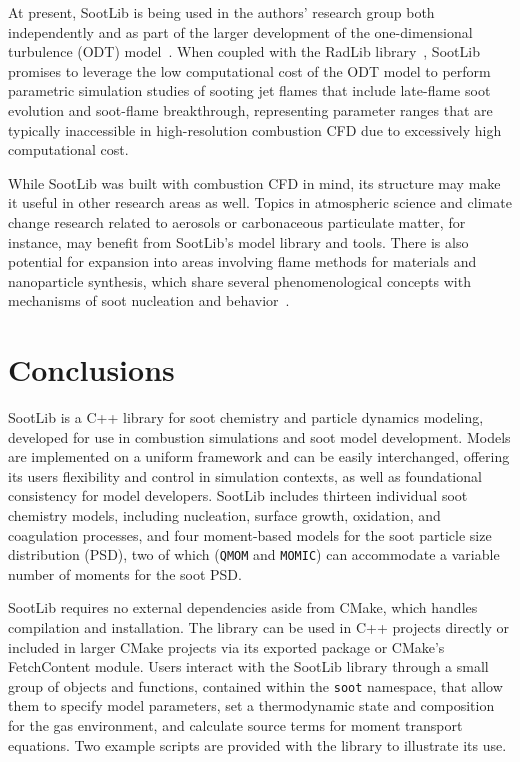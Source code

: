 \documentclass[preprint,letterpaper]{elsarticle}
\begin{document}
At present, SootLib is being used in the authors' research group both independently and as part of the larger development of the one-dimensional turbulence (ODT) model~\cite{Stephens_2021}. When coupled with the RadLib library~\cite{Stephens_2022}, SootLib promises to leverage the low computational cost of the ODT model to perform parametric simulation studies of sooting jet flames that include late-flame soot evolution and soot-flame breakthrough, representing parameter ranges that are typically inaccessible in high-resolution combustion CFD due to excessively high computational cost.

While SootLib was built with combustion CFD in mind, its structure may make it useful in other research areas as well. Topics in atmospheric science and climate change research related to aerosols or carbonaceous particulate matter, for instance, may benefit from SootLib's model library and tools. There is also potential for expansion into areas involving flame methods for materials and nanoparticle synthesis, which share several phenomenological concepts with mechanisms of soot nucleation and behavior~\cite{Wang_2011}.


\section{Conclusions}
\label{s:conclusions}

SootLib is a C++ library for soot chemistry and particle dynamics modeling, developed for use in combustion simulations and soot model development. Models are implemented on a uniform framework and can be easily interchanged, offering its users flexibility and control in simulation contexts, as well as foundational consistency for model developers. SootLib includes thirteen individual soot chemistry models, including nucleation, surface growth, oxidation, and coagulation processes, and four moment-based models for the soot particle size distribution (PSD), two of which (\texttt{QMOM} and \texttt{MOMIC}) can accommodate a variable number of moments for the soot PSD.

SootLib requires no external dependencies aside from CMake, which handles compilation and installation. The library can be used in C++ projects directly or included in larger CMake projects via its exported package or CMake's FetchContent module.
Users interact with the SootLib library through a small group of objects and functions, contained within the \texttt{soot} namespace, that allow them to specify model parameters, set a thermodynamic state and composition for the gas environment, and calculate source terms for moment transport equations. Two example scripts are provided with the library to illustrate its use.
\end{document}

